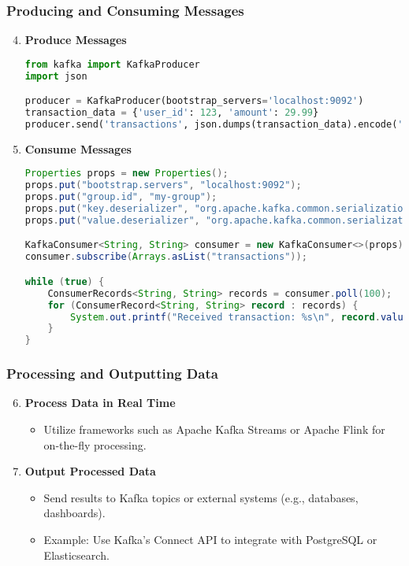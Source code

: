 \documentclass[aspectratio=169]{beamer}
\begin{document}
\begin{frame}[fragile]
    \frametitle{Producing and Consuming Messages}
    \begin{enumerate}
        \setcounter{enumi}{3}
        \item \textbf{Produce Messages}
            \begin{lstlisting}[language=Python]
from kafka import KafkaProducer
import json

producer = KafkaProducer(bootstrap_servers='localhost:9092')
transaction_data = {'user_id': 123, 'amount': 29.99}
producer.send('transactions', json.dumps(transaction_data).encode('utf-8'))
            \end{lstlisting}

        \item \textbf{Consume Messages}
            \begin{lstlisting}[language=Java]
Properties props = new Properties();
props.put("bootstrap.servers", "localhost:9092");
props.put("group.id", "my-group");
props.put("key.deserializer", "org.apache.kafka.common.serialization.StringDeserializer");
props.put("value.deserializer", "org.apache.kafka.common.serialization.StringDeserializer");

KafkaConsumer<String, String> consumer = new KafkaConsumer<>(props);
consumer.subscribe(Arrays.asList("transactions"));

while (true) {
    ConsumerRecords<String, String> records = consumer.poll(100);
    for (ConsumerRecord<String, String> record : records) {
        System.out.printf("Received transaction: %s\n", record.value());
    }
}
            \end{lstlisting}
    \end{enumerate}
\end{frame}

\begin{frame}
    \frametitle{Processing and Outputting Data}
    \begin{enumerate}
        \setcounter{enumi}{5}
        \item \textbf{Process Data in Real Time}
            \begin{itemize}
                \item Utilize frameworks such as Apache Kafka Streams or Apache Flink for on-the-fly processing.
            \end{itemize}

        \item \textbf{Output Processed Data}
            \begin{itemize}
                \item Send results to Kafka topics or external systems (e.g., databases, dashboards).
                \item Example: Use Kafka's Connect API to integrate with PostgreSQL or Elasticsearch.
            \end{itemize}
    \end{enumerate}
\end{frame}
\end{document}
